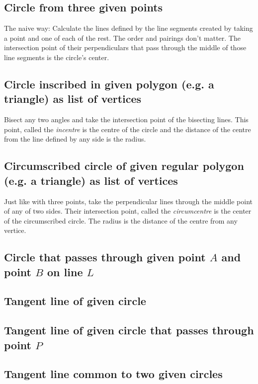 \documentclass[12pt,openany,a4,usenames,dvipsnames]{book}
\begin{document}
\subsection{Circle from three given points}
The naive way: Calculate the lines defined by the line segments created by taking a point and one of each of the rest. The order and pairings don't matter. The intersection point of their perpendiculars that pass through the middle of those line segments is the circle's center.
\subsection{Circle inscribed in given polygon (e.g. a triangle) as list of vertices}
Bisect any two angles and take the intersection point of the bisecting lines. This point, called the 
\emph{incentre} is the centre of the circle and the distance of the centre from the line defined by any side is the radius.
\subsection{Circumscribed circle of given regular polygon (e.g. a triangle) as list of vertices}
Just like with three points, take the perpendicular lines through the middle point of any of two sides. Their intersection point, called the \emph{circumcentre} is the center of the circumscribed circle. The radius is the distance of the centre from any vertice.
\subsection{Circle that passes through given point $Α$ and point $Β$ on line $L$}
\skelpar%
\subsection{Tangent line of given circle}
\skelpar%
\subsection{Tangent line of given circle that passes through point $P$}
\skelpar%
\subsection{Tangent line common to two given circles}
\skelpar%
\clearpage{}
\end{document}
